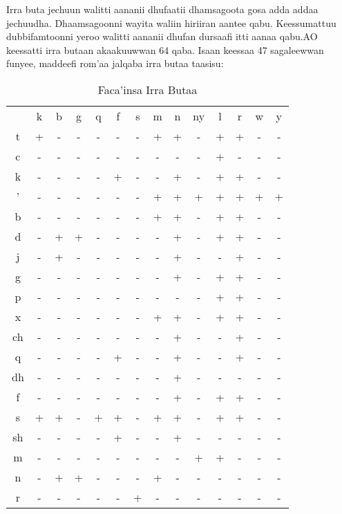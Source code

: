 \documentclass[11pt,b5paper]{book}
\begin{document}
Irra buta jechuun walitti aananii dhufaatii dhamsagoota gosa  adda addaa jechuudha. Dhaamsagoonni wayita waliin hiriiran  aantee qabu. Keessumattuu dubbifamtoonni yeroo walitti aananii dhufan dursaafi itti aanaa qabu.AO keessatti irra butaan akaakuuwwan 64 qaba. Isaan keessaa  47 sagaleewwan funyee, maddeefi rom’aa jalqaba irra butaa  taasisu\cite{lloret1988gemination}:  
\begin{table}[h!]
	\caption{Faca'insa Irra Butaa}
	\begin{tabular}{c c c c c c c c c c c c c c}
		\hline\hline
		& k & b & g & q & f & s & m & n & ny & l & r & w & y \\
		t & + & - & - & - & - & - & + & + & -  & + & + & - & -\\
		c & - & - & - & - & - & - & - & - & -  & + & - & - & -  \\
		k & - & - & - & - & + & - & - & + & -  & + & + & - & - \\
		' & - & - & - & - & - & - & + & + & +  & + & + & + & + \\
		b & - & - & - & - & - & - & + & + & -  & + & + & - & - \\
		d & - & + & + & - & - & - & - & + & -  & + & + & - & -  \\
		j & - & + & - & - & - & - & - & + & -  & - & + & - & -  \\
		g & - & - & - & - & - & - & - & + & -  & + & + & - & -  \\
		p & - & - & - & - & - & - & - & - & -  & + & + & - & -   \\
		x & - & - & - & - & - & - & + & + & -  & + & + & - & -  \\
		ch & - & - & - & - & - & - & - & + & - & - & + & - & -  \\
		q & - & - & - & - & + & - & - & + & -  & - & + & - & - \\
		dh & - & - & - & - & - & - & - & + & - & - & - & - & -   \\
		f & - & - & - & - & - & - & - & + & -  & + & + & - & -  \\
		s & + & + & - & + & + & - & + & + & -  & + & + & - & - \\
		sh & - & - & - & - & + & - & - & + & - & - & - & - & -   \\
		m & - & - & - & - & - & - & - & - & +  & + & - & - & -  \\
		n & - & + & + & - & - & - & + & - & -  & - & - & - & - \\
		r & - & - & - & - & - & + & - & - & -  & - & - & - & - \\
		\hline\hline  
	\end{tabular}
\end{table}
\end{document}
